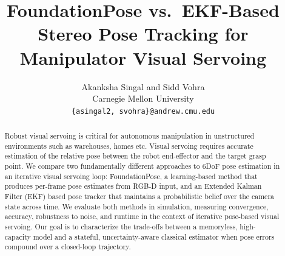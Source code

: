 \documentclass[letterpaper, 10 pt, conference]{ieeeconf}  %
\title{\LARGE \bf
FoundationPose vs.\ EKF-Based Stereo Pose Tracking for Manipulator Visual Servoing
}
\author{Akanksha Singal and Sidd Vohra\\
Carnegie Mellon University\\
{\tt\small \{asingal2, svohra\}@andrew.cmu.edu}
}
\begin{document}
\maketitle
\thispagestyle{empty}
\pagestyle{empty}


\begin{abstract}
Robust visual servoing is critical for autonomous manipulation in unstructured environments such as warehouses, homes etc. Visual servoing requires accurate estimation of the relative pose between the robot end-effector and the target grasp point. We compare two fundamentally different approaches to 6DoF pose estimation in an iterative visual servoing loop: FoundationPose, a learning-based method that produces per-frame pose estimates from RGB-D input, and an Extended Kalman Filter (EKF) based pose tracker that maintains a probabilistic belief over the camera state across time. We evaluate both methods in simulation, measuring convergence, accuracy, robustness to noise, and runtime in the context of iterative pose-based visual servoing. Our goal is to characterize the trade-offs between a memoryless, high-capacity model and a stateful, uncertainty-aware classical estimator when pose errors compound over a closed-loop trajectory.
\end{abstract}




\end{document}
